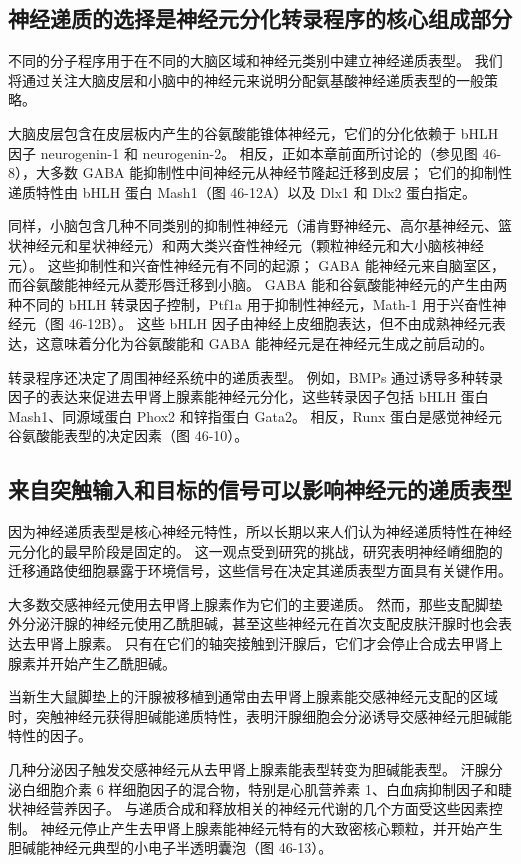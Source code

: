 \subsection{神经递质的选择是神经元分化转录程序的核心组成部分}
不同的分子程序用于在不同的大脑区域和神经元类别中建立神经递质表型。 我们将通过关注大脑皮层和小脑中的神经元来说明分配氨基酸神经递质表型的一般策略。

大脑皮层包含在皮层板内产生的谷氨酸能锥体神经元，它们的分化依赖于 bHLH 因子 neurogenin-1 和 neurogenin-2。 相反，正如本章前面所讨论的（参见图 46-8），大多数 GABA 能抑制性中间神经元从神经节隆起迁移到皮层； 它们的抑制性递质特性由 bHLH 蛋白 Mash1（图 46-12A）以及 Dlx1 和 Dlx2 蛋白指定。

同样，小脑包含几种不同类别的抑制性神经元（浦肯野神经元、高尔基神经元、篮状神经元和星状神经元）和两大类兴奋性神经元（颗粒神经元和大小脑核神经元）。 这些抑制性和兴奋性神经元有不同的起源； GABA 能神经元来自脑室区，而谷氨酸能神经元从菱形唇迁移到小脑。 GABA 能和谷氨酸能神经元的产生由两种不同的 bHLH 转录因子控制，Ptf1a 用于抑制性神经元，Math-1 用于兴奋性神经元（图 46-12B）。 这些 bHLH 因子由神经上皮细胞表达，但不由成熟神经元表达，这意味着分化为谷氨酸能和 GABA 能神经元是在神经元生成之前启动的。

转录程序还决定了周围神经系统中的递质表型。 例如，BMPs 通过诱导多种转录因子的表达来促进去甲肾上腺素能神经元分化，这些转录因子包括 bHLH 蛋白 Mash1、同源域蛋白 Phox2 和锌指蛋白 Gata2。 相反，Runx 蛋白是感觉神经元谷氨酸能表型的决定因素（图 46-10）。

\subsection{来自突触输入和目标的信号可以影响神经元的递质表型}
因为神经递质表型是核心神经元特性，所以长期以来人们认为神经递质特性在神经元分化的最早阶段是固定的。 这一观点受到研究的挑战，研究表明神经嵴细胞的迁移通路使细胞暴露于环境信号，这些信号在决定其递质表型方面具有关键作用。

大多数交感神经元使用去甲肾上腺素作为它们的主要递质。 然而，那些支配脚垫外分泌汗腺的神经元使用乙酰胆碱，甚至这些神经元在首次支配皮肤汗腺时也会表达去甲肾上腺素。 只有在它们的轴突接触到汗腺后，它们才会停止合成去甲肾上腺素并开始产生乙酰胆碱。

当新生大鼠脚垫上的汗腺被移植到通常由去甲肾上腺素能交感神经元支配的区域时，突触神经元获得胆碱能递质特性，表明汗腺细胞会分泌诱导交感神经元胆碱能特性的因子。

几种分泌因子触发交感神经元从去甲肾上腺素能表型转变为胆碱能表型。 汗腺分泌白细胞介素 6 样细胞因子的混合物，特别是心肌营养素 1、白血病抑制因子和睫状神经营养因子。 与递质合成和释放相关的神经元代谢的几个方面受这些因素控制。 神经元停止产生去甲肾上腺素能神经元特有的大致密核心颗粒，并开始产生胆碱能神经元典型的小电子半透明囊泡（图 46-13）。


